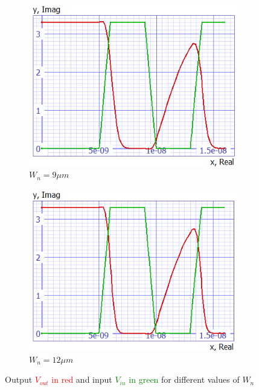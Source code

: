 \documentclass[../main.tex]{subfiles}
\begin{document}
{{\begin{figure}[H]
				\begin{subfigure}{0.3\textwidth}
					\centering
					\includegraphics[width=\textwidth]{plots/Q7_Wn9.png}
					\caption{$W_n = 9\mu m$}
					\label{fig:subfig4}
				\end{subfigure}
				\begin{subfigure}{0.3\textwidth}
					\centering
					\includegraphics[width=\textwidth]{plots/Q7_Wn12.png}
					\caption{$W_n = 12\mu m$}
					\label{fig:subfig5}
				\end{subfigure}
				
				\caption{Output \textcolor{red}{$V_{out}$ in red} and input \textcolor{green}{$V_{in}$ in green} for different values of $W_n$}
				\label{fig:mainfigWn}
			\end{figure}
			
}}
\end{document}
